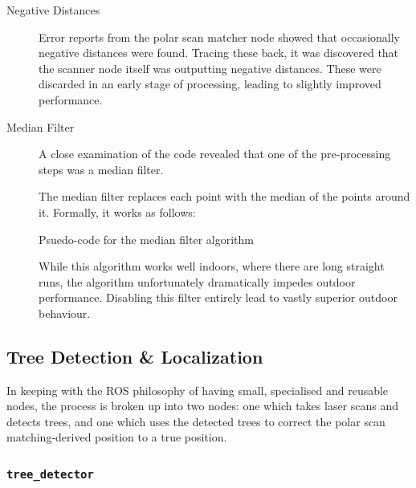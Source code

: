 \documentclass[12pt,oneside,a4paper]{book}
\begin{document}
\begin{description}
\item[Negative Distances] Error reports from the polar scan matcher node
  showed that occasionally negative distances were found. Tracing
  these back, it was discovered that the scanner node itself was
  outputting negative distances. These were discarded in an early
  stage of processing, leading to slightly improved performance.
\item[Median Filter] A close examination of the code revealed that one
  of the pre-processing steps was a median filter.

  The median filter replaces each point with the median of the points
  around it. Formally, it works as follows:
  \IncMargin{1em}
  \begin{algorithm}
    \BlankLine
    \caption{Psuedo-code for the median filter algorithm}
  \end{algorithm}

  While this algorithm works well indoors, where there are long
  straight runs, the algorithm unfortunately dramatically
  impedes outdoor performance. Disabling this filter entirely lead to
  vastly superior outdoor behaviour.
\end{description}


\subsection{Tree Detection \& Localization}
\label{sec:tree-detection-localization}


In keeping with the ROS philosophy of having small, specialised and
reusable nodes, the process is broken up into two nodes: one which
takes laser scans and detects trees, and one which uses the detected
trees to correct the polar scan matching-derived position to a true
position.

\subsubsection{\texttt{tree\_detector}}
\label{sec:tree_detector}
\end{document}
